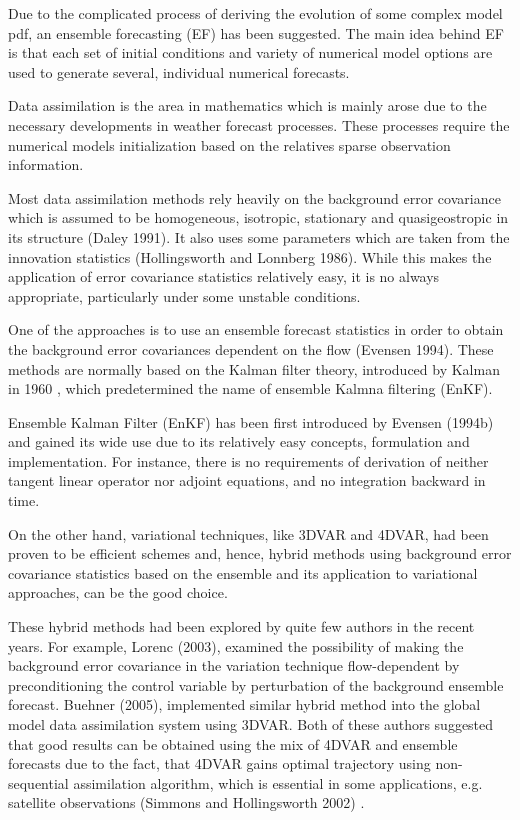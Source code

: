 \documentclass[a4,12pt]{article}
\numberwithin{equation}{section}
\begin{document}
Due to the complicated process of deriving the evolution of some complex model pdf, an ensemble forecasting (EF) has been suggested. The main idea behind EF is that each set of initial conditions and variety of numerical model options are used to generate several, individual numerical forecasts.

Data assimilation is the area in mathematics which is mainly arose due to the necessary developments in weather forecast processes. These processes require the numerical models initialization based on the relatives sparse observation information.  

Most data assimilation methods rely heavily on the background error covariance which is assumed to be homogeneous, isotropic, stationary and quasigeostropic in its structure (Daley 1991). It also uses some parameters which are taken from the innovation statistics (Hollingsworth and
Lonnberg 1986). While this makes the application of error covariance statistics relatively easy, it is no always appropriate, particularly under some unstable conditions.

One of the approaches is to use an ensemble forecast statistics in order to obtain the background error covariances dependent on the flow (Evensen 1994). These methods are normally based on the Kalman filter theory, introduced by Kalman in 1960 \cite{Kalman}, which predetermined the name of ensemble Kalmna filtering (EnKF).

Ensemble Kalman Filter (EnKF) has been first introduced by Evensen (1994b) and gained its wide use due to its relatively easy concepts, formulation and implementation. For instance, there is no requirements of derivation of neither tangent linear operator nor adjoint equations, and no integration backward in time.

On the other hand, variational techniques, like 3DVAR and 4DVAR, had been proven to be efficient schemes and, hence, hybrid methods using background error covariance statistics based on the ensemble and its application to variational approaches, can be the good choice.

These hybrid methods had been explored by quite few authors in the recent years. For example, Lorenc (2003), examined the possibility of making the background error covariance in the variation technique flow-dependent by preconditioning the control variable by perturbation of the background ensemble forecast.  Buehner (2005), implemented similar hybrid method into the global model data assimilation system using 3DVAR. Both of these authors suggested that good results can be obtained using the mix of 4DVAR and ensemble forecasts due to the fact, that 4DVAR gains optimal trajectory using non-sequential assimilation algorithm, which is essential in some applications, e.g. satellite observations (Simmons and
Hollingsworth 2002) \cite{foundation}. 
\end{document}
